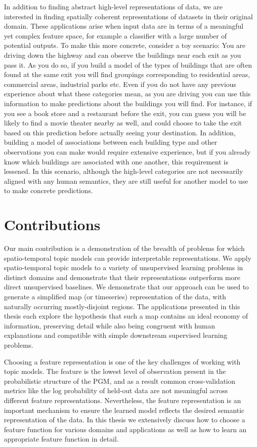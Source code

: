 In addition to finding abstract high-level representations of data, we are interested in finding spatially coherent representations of datasets in their original domain. These applications arise when input data are in terms of a meaningful yet complex feature space, for example a classifier with a large number of potential outputs. To make this more concrete, consider a toy scenario: You are driving down the highway and can observe the buildings near each exit as you pass it. As you do so, if you build a model of the types of buildings that are often found at the same exit you will find groupings corresponding to residential areas, commercial areas, industrial parks etc. Even if you do not have any previous experience about what these categories mean, as you are driving you can use this information to make predictions about the buildings you will find. For instance, if you see a book store and a restaurant before the exit, you can guess you will be likely to find a movie theater nearby as well, and could choose to take the exit based on this prediction before actually seeing your destination.
In addition, building a model of associations between each building type and other observations you can make would require extensive experience, but if you already know which buildings are associated with one another, this requirement is lessened. In this scenario, although the high-level categories are not necessarily aligned with any human semantics, they are still useful for another model to use to make concrete predictions.

\section{Contributions}
Our main contribution is a demonstration of the breadth of problems for which spatio-temporal topic models can provide interpretable representations. We apply spatio-temporal topic models to a variety of unsupervised learning problems in distinct domains and demonstrate that their representations outperform more direct unsupervised baselines. We demonstrate that our approach can be used to generate a simplified map (or timeseries) representation of the data, with naturally occurring mostly-disjoint regions. The applications presented in this thesis each explore the hypothesis that such a map contains an ideal economy of information, preserving detail while also being congruent with human explanations and compatible with simple downstream supervised learning problems.

Choosing a feature representation is one of the key challenges of working with topic models. The feature is the lowest level of observation present in the probabilistic structure of the PGM, and as a result common cross-validation metrics like the log probability of held-out data are not meaningful across different feature representations. Nevertheless, the feature representation is an important mechanism to ensure the learned model reflects the desired semantic representation of the data. In this thesis we extensively discuss how to choose a feature function for various domains and applications as well as how to learn an appropriate feature function in detail.

